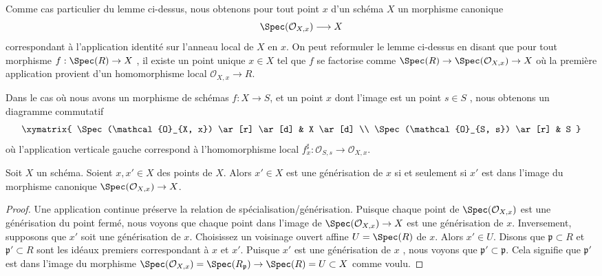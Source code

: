 \noindent
Comme cas particulier du lemme ci-dessus, nous obtenons pour tout point
 $x$  d'un schéma  $X$  un morphisme canonique
\begin{equation}
\label{equation-canonical-morphism}
\Spec(\mathcal{O}_{X, x}) \longrightarrow X
\end{equation}
correspondant à l'application identité sur l'anneau local de  $X$  en
 $x$. On peut reformuler le lemme ci-dessus en disant que pour tout
morphisme  $f : \Spec(R) \to X$ , il existe un point unique  $x \in X$  tel que
 $f$  se factorise comme  $\Spec(R) \to \Spec(\mathcal{O}_{X, x}) \to X$  où la première application provient
d'un homomorphisme local  $\mathcal{O}_{X, x} \to R$.

\medskip\noindent
Dans le cas où nous avons un morphisme de schémas  $f : X \to S$, et un point
 $x$  dont l'image est un point  $s \in S$ , nous obtenons un diagramme
commutatif
$$
\xymatrix{
\Spec(\mathcal{O}_{X, x}) \ar[r] \ar[d] & X \ar[d] \\
\Spec(\mathcal{O}_{S, s}) \ar[r] & S
}
$$
où l'application verticale gauche correspond à l'homomorphisme local
 $f^\sharp_x : \mathcal{O}_{S, s} \to \mathcal{O}_{X, x}$.

\begin{lemma}
\label{lemma-specialize-points}
Soit  $X$  un schéma. Soient  $x, x' \in X$  des points de  $X$. Alors
 $x' \in X$  est une générisation de  $x$  si et seulement si
 $x'$  est dans l'image du morphisme canonique  $\Spec(\mathcal{O}_{X, x}) \to X$.
\end{lemma}

\begin{proof}
Une application continue préserve la relation de spécialisation/générisation.
Puisque chaque point de  $\Spec(\mathcal{O}_{X, x})$  est une générisation du point fermé, nous
voyons que chaque point dans l'image de  $\Spec(\mathcal{O}_{X, x}) \to X$  est une générisation de
 $x$. Inversement, supposons que  $x'$  soit une générisation de
 $x$. Choisissez un voisinage ouvert affine  $U = \Spec(R)$  de  $x$.
Alors  $x' \in U$. Disons que  $\mathfrak p \subset R$  et  $\mathfrak p' \subset R$  sont les idéaux
premiers correspondant à  $x$  et  $x'$. Puisque  $x'$  est
une générisation de  $x$ , nous voyons que  $\mathfrak p' \subset \mathfrak p$. Cela signifie
que  $\mathfrak p'$  est dans l'image du morphisme  $\Spec(\mathcal{O}_{X, x}) = \Spec(R_{\mathfrak p})
\to \Spec(R) = U \subset X$  comme voulu.
\end{proof}

